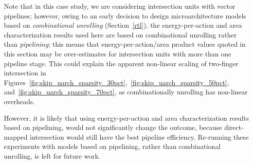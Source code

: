 Note that in this case study, we are considering intersection units with vector pipelines; however, owing to an early decision to design microarchitecture models based on \textit{combinational unrolling} (Section~\ref{rtl}), the energy-per-action and area characterization results used here are based on combinational unrolling rather than \textit{pipelining}; this means that energy-per-action/area product values quoted in this section may be over-estimates for intersection units with more than one pipeline stage. This could explain the apparent non-linear scaling of two-finger intersection in Figures~\ref{fig:skip_uarch_sparsity_30pct},~\ref{fig:skip_uarch_sparsity_50pct}, and~\ref{fig:skip_uarch_sparsity_70pct}, as combinationally unrolling has non-linear overheads. 

However, it is likely that using energy-per-action and area characterization results based on pipelining, would not significantly change the outcome, because direct-mapped intersection would still have the best pipeline efficiency. Re-running these experiments with models based on pipelining, rather than combinational unrolling, is left for future work.